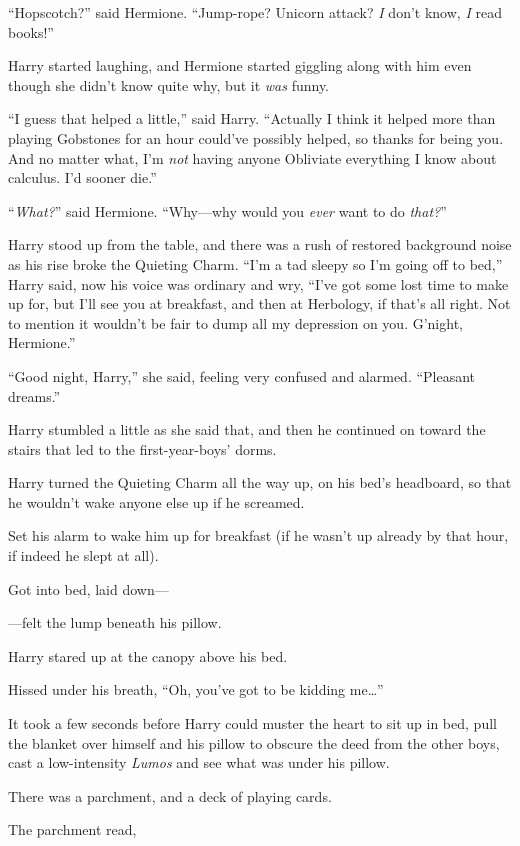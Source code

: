 “Hopscotch?” said Hermione. “Jump-rope? Unicorn attack? \emph{I} don’t know, \emph{I} read books!”

Harry started laughing, and Hermione started giggling along with him even though she didn’t know quite why, but it \emph{was} funny.

“I guess that helped a little,” said Harry. “Actually I think it helped more than playing Gobstones for an hour could’ve possibly helped, so thanks for being you. And no matter what, I’m \emph{not} having anyone Obliviate everything I know about calculus. I’d sooner die.”

“\emph{What?}” said Hermione. “Why—why would you \emph{ever} want to do \emph{that?}”

Harry stood up from the table, and there was a rush of restored background noise as his rise broke the Quieting Charm. “I’m a tad sleepy so I’m going off to bed,” Harry said, now his voice was ordinary and wry, “I’ve got some lost time to make up for, but I’ll see you at breakfast, and then at Herbology, if that’s all right. Not to mention it wouldn’t be fair to dump all my depression on you. G’night, Hermione.”

“Good night, Harry,” she said, feeling very confused and alarmed. “Pleasant dreams.”

Harry stumbled a little as she said that, and then he continued on toward the stairs that led to the first-year-boys’ dorms.

\later

Harry turned the Quieting Charm all the way up, on his bed’s headboard, so that he wouldn’t wake anyone else up if he screamed.

Set his alarm to wake him up for breakfast (if he wasn’t up already by that hour, if indeed he slept at all).

Got into bed, laid down—

—felt the lump beneath his pillow.

Harry stared up at the canopy above his bed.

Hissed under his breath, “Oh, you’ve got to be kidding me…”

It took a few seconds before Harry could muster the heart to sit up in bed, pull the blanket over himself and his pillow to obscure the deed from the other boys, cast a low-intensity \emph{Lumos} and see what was under his pillow.

There was a parchment, and a deck of playing cards.

The parchment read,

